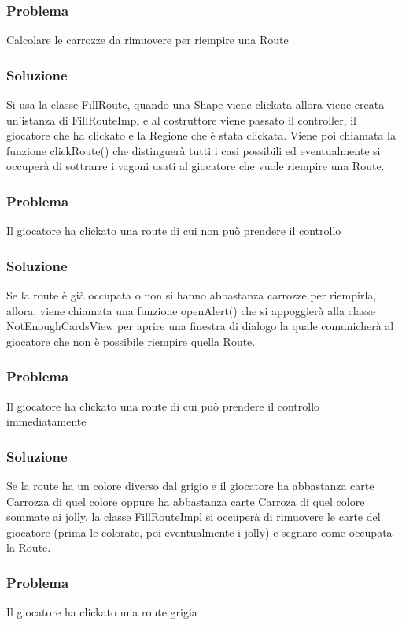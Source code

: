 \documentclass[a4paper,12pt]{report}
\begin{document}
\subsubsection{Problema}
Calcolare le carrozze da rimuovere per riempire una Route
%
\subsubsection{Soluzione}
Si usa la classe FillRoute, quando una Shape viene clickata allora viene creata un'istanza di FillRouteImpl
e al costruttore viene passato il controller, il giocatore che ha clickato e la Regione che è stata clickata. Viene poi chiamata la funzione clickRoute() che distinguerà tutti i casi possibili ed eventualmente si occuperà di sottrarre i vagoni usati al giocatore che vuole riempire una Route.
%
\newpage
\subsubsection{Problema}
Il giocatore ha clickato una route di cui non può prendere il controllo
%
\subsubsection{Soluzione}
Se la route è già occupata o non si hanno abbastanza carrozze per riempirla, allora, viene chiamata una funzione openAlert() che si appoggierà alla classe NotEnoughCardsView per aprire una finestra di dialogo la quale comunicherà al giocatore che non è possibile riempire quella Route.
%
%
\newpage
\subsubsection{Problema}
Il giocatore ha clickato una route di cui può prendere il controllo immediatamente
%
\subsubsection{Soluzione}
Se la route ha un colore diverso dal grigio e il giocatore ha abbastanza carte Carrozza di quel colore oppure ha abbastanza carte Carroza di quel colore sommate ai jolly, la classe FillRouteImpl si occuperà di rimuovere le carte del giocatore (prima le colorate, poi eventualmente i jolly) e segnare come occupata la Route.
%
\newpage
%
\subsubsection{Problema}
Il giocatore ha clickato una route grigia
%
\end{document}
